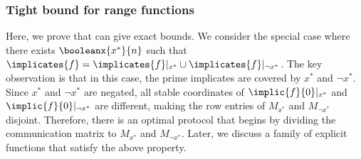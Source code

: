 \documentclass[acmsmall, nonacm, authorversion]{acmart}
\begin{document}
\subsubsection{Tight bound for range functions}\label{subsection:tight-lower-bound-range}
Here, we prove that  can give exact bounds. We consider the special case where there exists $\booleanx{x^*}{n}$ such that $\implicates{f}=\implicates{f}|_{x^*}\cup \implicates{f}|_{\neg x^*}$. The key observation is that in this case, the prime implicates are covered by $x^*$ and $\neg x^*$. Since $x^*$ and $\neg x^*$ are negated, all stable coordinates of $\implic{f}{0}|_{x^*}$ and $\implic{f}{0}|_{\neg x^*}$ are different, making the row entries of $M_{x^*}$ and $M_{\neg x^*}$ disjoint. Therefore, there is an optimal protocol that begins by dividing the communication matrix to $M_{x^*}$ and $M_{\neg x^*}$.
Later, we discuss a family of explicit functions that satisfy the above property.
\end{document}
